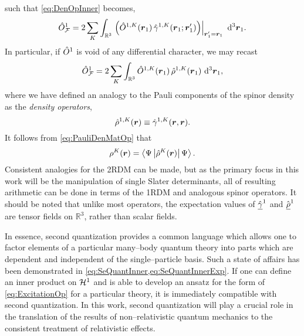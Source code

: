 such that \cref{eq:DenOpInner} becomes,
\begin{equation}
  \hat{O}_{\mathcal{F}}^1 = 2\sum_K \int_{\mathbb R^3} 
    \left.\left(\hat{O}^{1,K} (\boldsymbol{r}_1) \, \hat{\gamma}^{1,K}(\boldsymbol{r}_1; \boldsymbol{r}'_1) \right) \right\vert_{\boldsymbol{r}'_1 = \boldsymbol{r}_1 } 
    \,\,\mathrm{d}^3 \boldsymbol{r}_1.
\end{equation}
In particular, if $\hat{O}^1$ is void of any differential character, we may recast
\begin{equation}
  \hat{O}_{\mathcal{F}}^1 = 2\sum_K \int_{\mathbb R^3} 
    \hat{O}^{1,K} (\boldsymbol{r}_1) \, \hat{\rho}^{1,K}(\boldsymbol{r}_1)  
    \,\,\mathrm{d}^3 \boldsymbol{r}_1,
\end{equation}
where we have defined an analogy to the Pauli components of the spinor density as
the \emph{density operators},
\begin{equation}
\hat{\rho}^{1,K}(\boldsymbol{r}) \equiv \hat{\gamma}^{1,K}(\boldsymbol{r},\boldsymbol{r}).
\end{equation}
It follows from \cref{eq:PauliDenMatOp} that
\begin{equation}
\rho^K(\boldsymbol{r}) = \left\langle \Psi \left\vert \hat{\rho}^K(\boldsymbol{r}) \right\vert \Psi \right\rangle.
\end{equation}
Consistent analogies for the 2RDM can be made, but as the primary focus in this work will be the manipulation
of single Slater determinants, all of resulting arithmetic can be done in terms of the 1RDM and analogous
spinor operators. It should be noted that unlike most operators, the expectation values of 
$\hat{\underline{\gamma}}^1$ and $\hat{\underline{\rho}}^1$ are tensor fields on $\mathbb R^3$, rather than scalar fields.


In essence, second quantization provides a common language which allows one to factor elements of a particular many--body
quantum theory into parts which are dependent and independent of the single--particle basis. Such a state of affairs has
been demonstrated in \cref{eq:SeQuantInner,eq:SeQuantInnerExp}. If one can define an inner product on $\mathcal{H}^1$ and
is able to develop an ansatz for the form of \cref{eq:ExcitationOp} for a particular theory, it is immediately compatible
with second quantization. In this work, second quantization will play a crucial role in the translation of the
results of non--relativistic quantum mechanics to the consistent treatment of relativistic effects.



